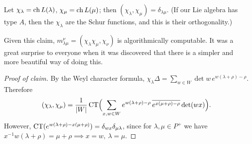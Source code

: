 \begin{claim}
Let $\chi_\lambda = \operatorname{ch} L(\lambda)$, $\chi_\mu = \operatorname{ch} L(\mu)$; then
$(\chi_\lambda, \chi_\mu) = \delta_{\lambda\mu}$. (If our Lie algebra has type
$A$, then the $\chi_\lambda$ are the Schur functions, and this is their
orthogonality.)
\end{claim}

Given this claim, $m_{\lambda\mu}^\nu = (\chi_\lambda\chi_\mu, \chi_\nu)$ is
algorithmically computable. It was a great surprise to everyone when it was
discovered that there is a simpler and more beautiful way of doing this.

\begin{proof}[Proof of claim]
By the Weyl character formula, $\chi_\lambda\Delta = \sum_{w \in W} \det w\,
e^{w(\lambda+\rho) - \rho}$. Therefore
\[
  (\chi_\lambda, \chi_\mu) = \frac{1}{|W|}\operatorname{CT}\Bigl(\sum_{x, w \in W}
    e^{w(\lambda+\rho) - \rho}\,\overline{e^{x(\mu+\rho) - \rho}}\det(wx)\Bigr).
\]
However, $\operatorname{CT}(e^{w(\lambda+\rho) - x(\mu+\rho)}) = \delta_{wx}\delta_{\mu\lambda}$,
since for $\lambda, \mu \in P^+$ we have
$x^{-1}w(\lambda + \rho) = \mu + \rho \implies x = w,\ \lambda = \mu$.
\end{proof}

